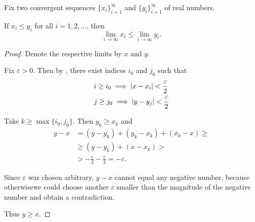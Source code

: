 \begin{proposition}\label{thm:one_sided_squeeze_lemma}
  Fix two convergent sequences \( \{ x_i \}_{i=1}^\infty \) and \( \{ y_i \}_{i=1}^\infty \) of real numbers.

  If \( x_i \leq y_i \) for all \( i = 1, 2, \ldots \), then
  \begin{equation*}
    \lim_{i \to \infty} x_i \leq \lim_{i \to \infty} y_i.
  \end{equation*}
\end{proposition}
\begin{proof}
  Denote the respective limits by \( x \) and \( y \).

  Fix \( \varepsilon > 0 \). Then by , there exist indices \( i_0 \) and \( j_0 \) such that
  \begin{align*}
    &i \geq i_0 \implies \left\vert x - x_i \right\vert < \frac \varepsilon 2 \\
    &j \geq j_0 \implies \left\vert y - y_j \right\vert < \frac \varepsilon 2
  \end{align*}

  Take \( k \geq \max \{ i_0, j_0 \} \). Then \( y_k \geq x_k \) and
  \begin{align*}
    y - x
    &=
    (y - y_k) + (y_k - x_k) + (x_k - x)
    \geq \\ &\geq
    (y - y_k) + (x - x_k)
    > \\ &>
    - \frac \varepsilon 2 - \frac \varepsilon 2
    =
    - \varepsilon.
  \end{align*}

  Since \( \varepsilon \) was chosen arbitrary, \( y - x \) cannot equal any negative number, because otherwise\LEM we could choose another \( \varepsilon \) smaller than the magnitude of the negative number and obtain a contradiction.

  Thus \( y \geq x \).
\end{proof}

